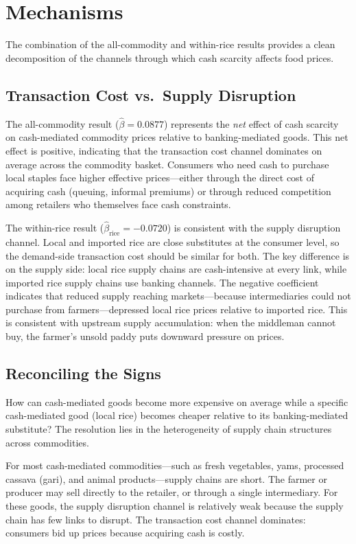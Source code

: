 \documentclass[12pt]{article}
\begin{document}
\section{Mechanisms}
\label{sec:mechanisms}

The combination of the all-commodity and within-rice results provides a clean decomposition of the channels through which cash scarcity affects food prices.

\subsection{Transaction Cost vs.\ Supply Disruption}

The all-commodity result ($\hat{\beta} = 0.0877$) represents the \emph{net} effect of cash scarcity on cash-mediated commodity prices relative to banking-mediated goods. This net effect is positive, indicating that the transaction cost channel dominates on average across the commodity basket. Consumers who need cash to purchase local staples face higher effective prices---either through the direct cost of acquiring cash (queuing, informal premiums) or through reduced competition among retailers who themselves face cash constraints.

The within-rice result ($\hat{\beta}_{\text{rice}} = -0.0720$) is consistent with the supply disruption channel. Local and imported rice are close substitutes at the consumer level, so the demand-side transaction cost should be similar for both. The key difference is on the supply side: local rice supply chains are cash-intensive at every link, while imported rice supply chains use banking channels. The negative coefficient indicates that reduced supply reaching markets---because intermediaries could not purchase from farmers---depressed local rice prices relative to imported rice. This is consistent with upstream supply accumulation: when the middleman cannot buy, the farmer's unsold paddy puts downward pressure on prices.

\subsection{Reconciling the Signs}

How can cash-mediated goods become more expensive on average while a specific cash-mediated good (local rice) becomes cheaper relative to its banking-mediated substitute? The resolution lies in the heterogeneity of supply chain structures across commodities.

For most cash-mediated commodities---such as fresh vegetables, yams, processed cassava (gari), and animal products---supply chains are short. The farmer or producer may sell directly to the retailer, or through a single intermediary. For these goods, the supply disruption channel is relatively weak because the supply chain has few links to disrupt. The transaction cost channel dominates: consumers bid up prices because acquiring cash is costly.
\end{document}
